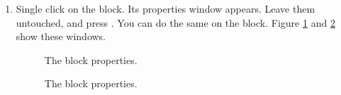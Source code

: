 \begin{enumerate}
\item
  Single click on the  block. Its properties window
  appears. Leave them untouched, and press . You can do the
  same on the  block. Figure \ref{fig:clockproperties} and
  \ref{fig:sineproperties} show these windows.
%
\begin{figure}[htb]
\caption{The  block properties.}
\label{fig:clockproperties}
\end{figure}
%
\begin{figure}[htb]
\caption{The  block properties.}
\label{fig:sineproperties}
\end{figure}


\end{enumerate}
